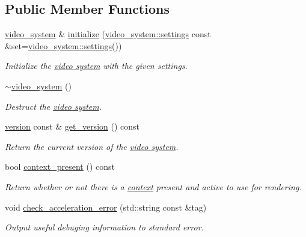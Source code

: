 \subsection*{Public Member Functions}
\begin{DoxyCompactItemize}
\item 
\hyperlink{classgfx_1_1video__system}{video\-\_\-system} \& \hyperlink{classgfx_1_1video__system_afb91ba4ef2705100683d6956a64f051a}{initialize} (\hyperlink{classgfx_1_1video__system_1_1settings}{video\-\_\-system\-::settings} const \&set=\hyperlink{classgfx_1_1video__system_1_1settings}{video\-\_\-system\-::settings}())
\begin{DoxyCompactList}\small\item\em Initialize the \hyperlink{classgfx_1_1video__system}{video system} with the given settings. \end{DoxyCompactList}\item 
\hyperlink{classgfx_1_1video__system_aca978b2f1ada65c0f66d35cbf0e62c15}{$\sim$video\-\_\-system} ()
\begin{DoxyCompactList}\small\item\em Destruct the \hyperlink{classgfx_1_1video__system}{video system}. \end{DoxyCompactList}\item 
\hyperlink{classgfx_1_1version}{version} const \& \hyperlink{classgfx_1_1video__system_a88a112c806ac494b0145ce0648fc3c66}{get\-\_\-version} () const 
\begin{DoxyCompactList}\small\item\em Return the current version of the \hyperlink{classgfx_1_1video__system}{video system}. \end{DoxyCompactList}\item 
bool \hyperlink{classgfx_1_1video__system_a3a0674569628642598290a80c0156de7}{context\-\_\-present} () const 
\begin{DoxyCompactList}\small\item\em Return whether or not there is a \hyperlink{classgfx_1_1context}{context} present and active to use for rendering. \end{DoxyCompactList}\item 
void \hyperlink{classgfx_1_1video__system_a0fb2d605485135fa117e1a14346f9fb1}{check\-\_\-acceleration\-\_\-error} (std\-::string const \&tag)
\begin{DoxyCompactList}\small\item\em Output useful debuging information to standard error. \end{DoxyCompactList}\item 

\end{DoxyCompactItemize}
